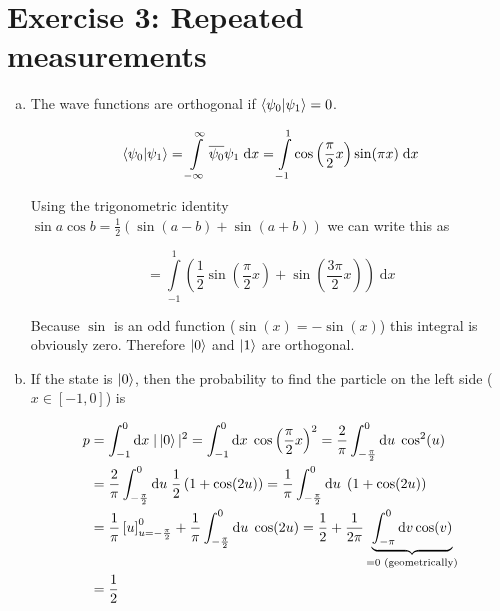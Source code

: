 \documentclass[a4paper,german,12pt,smallheadings]{scrartcl}
\begin{document}
\section*{Exercise 3: Repeated measurements}
\begin{enumerate}[a)]
  \item
    The wave functions are orthogonal if $\braket{\psi_0|\psi_1} = 0$.

    \begin{equation*}
      \braket{\psi_0|\psi_1} 
      = \int\limits_{- \infty}^{\infty} \overline{\psi_0} \psi_1 \; \text{d}x
      = \int\limits_{- 1}^{1} \cos\left(\frac{\pi}{2}x\right) \sin(\pi x) \; \text{d}x
    \end{equation*}

    Using the trigonometric identity $\sin a \cos b = \frac{1}{2} \left( \sin(a
    -b) + \sin(a+b) \right)$ we can write this as

    \begin{equation*}
      = \int\limits_{-1}^{1} \left(\frac{1}{2} \sin\left(\frac{\pi}{2} x\right) + \sin \left( \frac{3 \pi}{2} x\right)\right) \;\text{d}x
    \end{equation*}

    Because $\sin$ is an odd function ($\sin(x) = -\sin(x)$) this integral is
    obviously zero. Therefore $\ket{0}$ and $\ket{1}$ are orthogonal.
  \item
    If the state is $\ket{0}$, then the probability to find the particle on the
    left side ($x \in [-1, 0]$) is

    \begin{align*}
      p
      &= \int_{-1}^0 \text{d}x \; |\ket{0}|^2
      = \int_{-1}^0 \text{d}x \; \cos\left(\frac{\pi}{2} x\right)^2
      = \frac{2}{\pi} \int_{-\frac{\pi}{2}}^0 \text{d}u \; \cos^2(u) \\
      &= \frac{2}{\pi} \int_{-\frac{\pi}{2}}^0 \text{d}u \; \frac{1}{2} \left( 1+ \cos(2u) \right)
      = \frac{1}{\pi} \int_{-\frac{\pi}{2}}^0 \text{d}u \; \left(1+ \cos(2u) \right) \\
      &= \frac{1}{\pi} \left[u\right]_{u=-\frac{\pi}{2}}^0 + \frac{1}{\pi} \int_{-\frac{\pi}{2}}^0 \text{d}u \; \cos(2u)
      = \frac{1}{2} + \frac{1}{2 \pi} \underbrace{\int_{-\pi}^0 \text{d}v \cos(v)}_{= 0 \text{ (geometrically)}} \\
      &= \frac{1}{2}
    \end{align*}


\end{enumerate}
\end{document}
